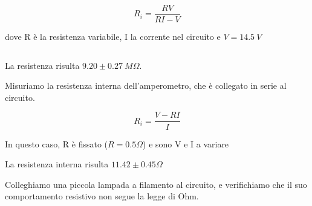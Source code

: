 $$R_i = \frac{RV}{RI-V} $$

dove R è la resistenza variabile, I la corrente nel circuito e $V= 14.5\ V$

\begin{center}
\begin{tabular}{*{2}{c}}
\end{tabular}

La resistenza risulta $9.20 \pm 0.27 \ M \Omega$.


Misuriamo la resistenza interna dell'amperometro, che è collegato in serie al circuito. 

$$R_i = \frac{V-RI}{I}$$

In questo caso, R è fissato ($R=0.5 \Omega$) e sono V e I a variare

La resistenza interna risulta $11.42 \pm 0.45 \Omega$


\end{center}


Colleghiamo una piccola lampada a filamento al circuito, e verifichiamo che il suo comportamento resistivo non segue la legge di Ohm. 





